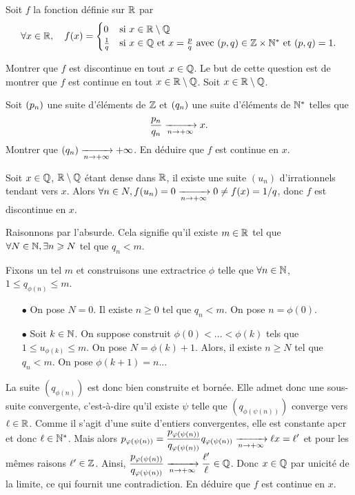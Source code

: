 \documentclass{magnolia}
\begin{document}
Soit $f$ la fonction définie sur $\mathbb{R}$ par
\[\forall x\in\mathbb{R} ,\quad f(x)=
  \begin{cases}
  0 & \text{si $x\in\mathbb{R}\setminus\mathbb{Q}$}\\
  \frac{1}{q} & \text{si $x\in\mathbb{Q}$ et $x=\frac{p}{q}$ avec
    $\left(p,q\right)\in\mathbb{Z}\times{\mathbb{N}^*}$ et $\left(p,q\right)=1$.}
  \end{cases}\]
\begin{questions}
\question Montrer que $f$ est discontinue en tout $x\in\mathbb{Q}$.
\question Le but de cette question est de montrer que $f$ est continue en tout
  $x\in\mathbb{R}\setminus\mathbb{Q}$. Soit $x\in\mathbb{R}\setminus\mathbb{Q}$.
  \begin{questions}
  \question Soit $\left(p_n\right)$ une suite d'éléments de $\mathbb{Z}$ et $\left(q_n\right)$ une suite
    d'éléments de ${\mathbb{N}^*}$ telles que
    \[\frac{p_n}{q_n}\xrightarrow[n\rightarrow +\infty]{} x.\]
    Montrer que $\left(q_n\right)\xrightarrow[n\rightarrow +\infty]{}+\infty$.
  \question En déduire que $f$ est continue en $x$.
  \end{questions}
\end{questions}

\begin{sol}
\begin{questions}
\question Soit $x\in \mathbb{Q}$, $\mathbb{R}\setminus\mathbb{Q}$ étant dense dans $\mathbb{R}$, il existe une suite $(u_n)$ d'irrationnels tendant vers $x$. Alors $\forall n \in N, f(u_n)=0\xrightarrow[n\rightarrow +\infty]{}0\neq f(x)=1/q$, donc $f$ est discontinue en $x$.
\question 
  \begin{questions}
  \question Raisonnons par l'absurde. Cela signifie qu'il existe $m\in \mathbb{R}$ tel que $\forall N \in \mathbb{N}, \exists n\geqslant N$ tel que $q_n < m$.

Fixons un tel $m$ et construisons une extractrice $\phi$ telle que $\forall n \in \mathbb{N}$, $1\leq q_{\phi(n)}\leq m$.
\begin{itemize}
\item[$\bullet$] On pose $N=0$. Il existe $n\geq 0$ tel que $q_n<m$. On pose $n=\phi(0)$.
\item[$\bullet$] Soit $k\in \mathbb{N}$. On suppose construit $\phi(0)< \ldots< \phi(k)$ tels que $1\leq u_{\phi(k)}\leq m$.
On pose $N=\phi(k)+1$. Alors, il existe $n\geq N$ tel que $q_n<m$. On pose $\phi(k+1)=n$...
\end{itemize}
La suite $(q_{\phi(n)})$ est donc bien construite et bornée. Elle admet donc une sous-suite convergente, c'est-à-dire qu'il existe $\psi$ telle que $(q_{\phi(\psi(n))})$ converge vers $\ell \in \mathbb{R}$. Comme il s'agit d'une suite d'entiers convergentes, elle est constante apcr et donc $\ell \in {\mathbb{N}^*}$. Mais alors $\displaystyle p_{\varphi(\psi(n))}=\frac{p_{\varphi(\psi(n))}}{q_{\varphi(\psi(n))}}q_{\varphi(\psi(n))} \xrightarrow[n\rightarrow +\infty]{}{\ell x}=\ell'$ et pour les mêmes raisons $\ell' \in \mathbb{Z}$.
Ainsi, $\displaystyle \frac{p_{\varphi(\psi(n))}}{q_{\varphi(\psi(n))}} \xrightarrow[n\rightarrow +\infty]{} \frac{\ell'}{\ell} \in \mathbb{Q}$. Donc $x\in \mathbb{Q}$ par unicité de la limite, ce qui fournit une contradiction.
  \question En déduire que $f$ est continue en $x$.
  \end{questions}
\end{questions}


\end{sol}
\end{document}
